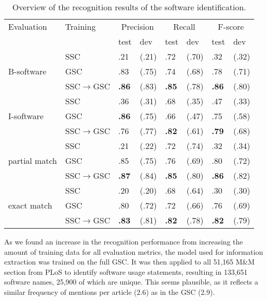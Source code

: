 \documentclass[runningheads]{llncs}
\begin{document}
\begin{table}[tb]
    \centering
    \caption{Overview of the recognition results of the software identification.}
    \label{tab:results}
    \begin{tabularx}{\textwidth}{XXp{1cm}p{1cm}p{1cm}p{1cm}p{1cm}p{1cm}}
      \toprule
    Evaluation & Training & \multicolumn{2}{c}{Precision}  & \multicolumn{2}{c}{Recall} & \multicolumn{2}{c}{F-score} \\ 
    && test & dev & test & dev & test & dev\\
      \midrule
       & SSC & .21 & (.21) & .72 & (.70) & .32 & (.32) \\
      B-software & GSC & .83 & (.75) & .74 & (.68) & .78 & (.71) \\ 
       & SSC$\rightarrow$GSC & \textbf{.86} & (.83) & \textbf{.85} & (.78) & \textbf{.86} & (.80) \\ 
      \midrule
       & SSC & .36 & (.31) & .68 & (.35) & .47 & (.33) \\ 
      I-software & GSC & \textbf{.86} & (.75) & .66 & (.47) & .75 & (.58) \\ 
       & SSC$\rightarrow$GSC & .76 & (.77) & \textbf{.82} & (.61) & \textbf{.79} & (.68) \\ 
      \midrule
      & SSC & .21 & (.22) & .72 & (.74) & .32 & (.34) \\ 
      partial match & GSC & .85 & (.75) & .76 & (.69) & .80 & (.72) \\ 
       & SSC$\rightarrow$GSC & \textbf{.87} & (.84) & \textbf{.85} & (.80) & \textbf{.86} & (.82) \\ 
      \midrule
       & SSC & .20 & (.20) & .68 & (.64) & .30 & (.30) \\ 
      exact match & GSC & .80 & (.72) & .72 & (.66) & .76 & (.69) \\ 
       & SSC$\rightarrow$GSC & \textbf{.83} & (.81) & \textbf{.82} & (.78) & \textbf{.82} & (.79) \\ 
       \bottomrule
    \end{tabularx}
    \end{table} 
As we found an increase in the recognition performance from increasing the amount of training data for all evaluation metrics, the model used for information extraction was trained on the full GSC.
It was then applied to all 51,165 M\&M section from PLoS to identify software usage statements, resulting in 133,651 software names, 25,900 of which are unique.
This seems plausible, as it reflects a similar frequency of mentions per article (2.6) as in the GSC (2.9).    
\end{document}
